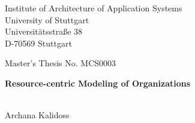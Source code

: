 \documentclass[
               fontsize=12pt, %
               paper=a4,
               twoside, %
               BCOR=3mm, %
               DIV=13,   %
               headinclude=true,
               footinclude=false,
               bibliography=totoc,
               headsepline,
               cleardoublepage=empty,
               parskip=half,
               pointlessnumbers, %
               final   %
               ]{scrbook}
\begin{document}
\pagestyle{plain}
\begin{titlepage}
	\begin{sffamily}
		\begin{center}
			Institute of Architecture of Application Systems\\
			University of Stuttgart\\
			Universitätsstraße 38\\
			D-70569 Stuttgart\\
		\end{center}
		
		\vspace{3.5cm}
		
		\begin{center}
			{Master's Thesis No. MCS0003 }\\
			\vspace{0.5cm}
			\begin{minipage}{8.5cm}
				\begin{center}
					
					\Large \textbf{Resource-centric Modeling of Organizations}
					
				\end{center}
			\end{minipage}
			\\
			\vspace{1cm}
			{Archana Kalidoss}
		\end{center}
		
		\vspace{1.0cm}
		

\end{sffamily}
\end{titlepage}
\end{document}
